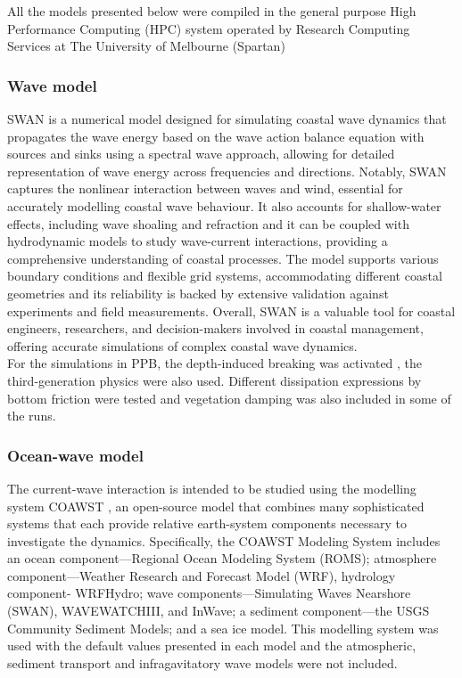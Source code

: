 \documentclass[12pt]{article}
\begin{document}
All the models presented below were compiled in the general purpose High Performance Computing (HPC) system operated by Research Computing Services at The University of Melbourne (Spartan)

\subsubsection*{Wave model}

SWAN is a numerical model designed for simulating coastal wave dynamics that propagates the wave energy based on the wave action balance equation with sources and sinks using a spectral wave approach, allowing for detailed representation of wave energy across frequencies and directions. Notably, SWAN captures the nonlinear interaction between waves and wind, essential for accurately modelling coastal wave behaviour. It also accounts for shallow-water effects, including wave shoaling and refraction and it can be coupled with hydrodynamic models to study wave-current interactions, providing a comprehensive understanding of coastal processes. The model supports various boundary conditions and flexible grid systems, accommodating different coastal geometries and its reliability is backed by extensive validation against experiments and field measurements. Overall, SWAN is a valuable tool for coastal engineers, researchers, and decision-makers involved in coastal management, offering accurate simulations of complex coastal wave dynamics.\\

For the simulations in PPB, the depth-induced breaking was activated \parencite{Battjes1978}, the third-generation physics were also used. Different dissipation expressions by bottom friction were tested \parencite{Madsen_Poon_Graber_1988,Smith2011} and vegetation damping \parencite{Suzuki2011} was also included in some of the runs.

\subsubsection*{Ocean-wave model}

The current-wave interaction is intended to be studied using the modelling system COAWST \parencite{Warner2010}, an open-source model that combines many sophisticated systems that each provide relative earth-system components necessary to investigate the dynamics. Specifically, the COAWST Modeling System includes an ocean component—Regional Ocean Modeling System (ROMS); atmosphere component—Weather Research and Forecast Model (WRF), hydrology component- WRF\textunderscore Hydro; wave components—Simulating Waves Nearshore (SWAN), WAVEWATCHIII, and InWave; a sediment component—the USGS Community Sediment Models; and a sea ice model. This modelling system was used with the default values presented in each model and the atmospheric, sediment transport and infragavitatory wave models were not included.  
\end{document}
